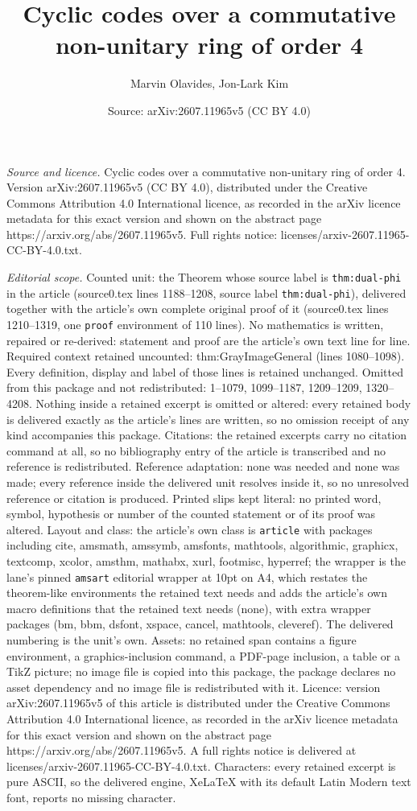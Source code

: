 \documentclass[10pt,a4paper]{amsart}
\title[Cyclic codes over a commutative non-unitary ring of order 4]{Cyclic codes over a commutative non-unitary ring of order 4}
\author{Marvin Olavides, Jon-Lark Kim}
\date{Source: arXiv:2607.11965v5 (CC BY 4.0)}
\begin{document}
\maketitle

\noindent\emph{Source and licence.} Cyclic codes over a commutative non-unitary ring of order 4. Version arXiv:2607.11965v5 (CC BY 4.0), distributed under the Creative Commons Attribution 4.0 International licence, as recorded in the arXiv licence metadata for this exact version and shown on the abstract page https://arxiv.org/abs/2607.11965v5. Full rights notice: licenses/arxiv-2607.11965-CC-BY-4.0.txt.\par\smallskip

\noindent\textit{Editorial scope.} Counted unit: the Theorem whose source label is \texttt{thm:dual-phi} in the article (source0.tex lines 1188--1208, source label \texttt{thm:dual-phi}), delivered together with the article's own complete original proof of it (source0.tex lines 1210--1319, one \texttt{proof} environment of 110 lines). No mathematics is written, repaired or re-derived: statement and proof are the article's own text line for line. Required context retained uncounted: thm:GrayImageGeneral (lines 1080--1098). Every definition, display and label of those lines is retained unchanged. Omitted from this package and not redistributed: 1--1079, 1099--1187, 1209--1209, 1320--4208. Nothing inside a retained excerpt is omitted or altered: every retained body is delivered exactly as the article's lines are written, so no omission receipt of any kind accompanies this package. Citations: the retained excerpts carry no citation command at all, so no bibliography entry of the article is transcribed and no reference is redistributed. Reference adaptation: none was needed and none was made; every reference inside the delivered unit resolves inside it, so no unresolved reference or citation is produced. Printed slips kept literal: no printed word, symbol, hypothesis or number of the counted statement or of its proof was altered. Layout and class: the article's own class is \texttt{article} with packages including cite, amsmath, amssymb, amsfonts, mathtools, algorithmic, graphicx, textcomp, xcolor, amsthm, mathabx, xurl, footmisc, hyperref; the wrapper is the lane's pinned \texttt{amsart} editorial wrapper at 10pt on A4, which restates the theorem-like environments the retained text needs and adds the article's own macro definitions that the retained text needs (none), with extra wrapper packages (bm, bbm, dsfont, xspace, cancel, mathtools, cleveref). The delivered numbering is the unit's own. Assets: no retained span contains a figure environment, a graphics-inclusion command, a PDF-page inclusion, a table or a TikZ picture; no image file is copied into this package, the package declares no asset dependency and no image file is redistributed with it. Licence: version arXiv:2607.11965v5 of this article is distributed under the Creative Commons Attribution 4.0 International licence, as recorded in the arXiv licence metadata for this exact version and shown on the abstract page https://arxiv.org/abs/2607.11965v5. A full rights notice is delivered at licenses/arxiv-2607.11965-CC-BY-4.0.txt. Characters: every retained excerpt is pure ASCII, so the delivered engine, XeLaTeX with its default Latin Modern text font, reports no missing character.
\end{document}
